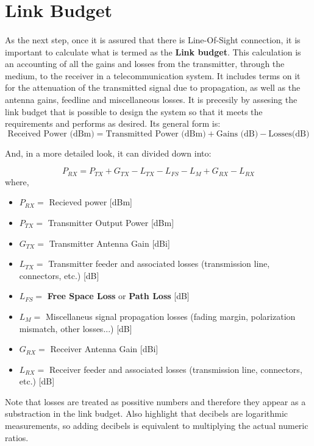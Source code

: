 \section{Link Budget}\label{subsec:link_budget}
\paragraph{}
As the next step, once it is assured that there is Line-Of-Sight connection, it is important to calculate what is termed as the \textbf{Link budget}. This calculation is an accounting of all the gains and losses from the transmitter, through the medium,  to the receiver in a telecommunication system. It includes terms on it for the attenuation of the transmitted signal due to propagation, as well as the antenna gains, feedline and miscellaneous losses. It is precesily by assesing the link budget that is possible to design the system so that it meets the requirements and performs as desired. Its general form is:
\begin{equation*}\label{eq:link_budget} 
 		\text{Received Power (dBm)} = \text{Transmitted Power (dBm)} + \text{Gains (dB)} - \text{Losses(dB)}
\end{equation*}

And, in a more detailed look, it can divided down into:

\begin{equation*}\label{eq:link_budget} 
 		P_{RX} = P_{TX} + G_{TX} - L_{TX} - L_{FS} - L_{M} + G_{RX} - L_{RX}
\end{equation*}
where,
\begin{itemize}
\item{$P_{RX} =$ Recieved power [dBm]}
\item{$P_{TX} =$ Transmitter Output Power [dBm]}
\item{$G_{TX} =$ Transmitter Antenna Gain [dBi]}
\item{$L_{TX} =$ Transmitter feeder and associated losses (transmission line, connectors, etc.) [dB]}
\item{$L_{FS} =$ \textbf{Free Space Loss} or \textbf{Path Loss} [dB]}
\item{$L_{M} =$ Miscellaneus signal propagation losses (fading margin, polarization mismatch, other losses...) [dB]} 
\item{$G_{RX} =$ Receiver Antenna Gain [dBi]}
\item{$L_{RX} =$ Receiver feeder and associated losses (transmission line, connectors, etc.) [dB]} 
\end{itemize}
Note that losses are treated as possitive numbers and therefore they appear as a substraction in the link budget. Also highlight that decibels are logarithmic measurements, so adding decibels is equivalent to multiplying the actual numeric ratios.
